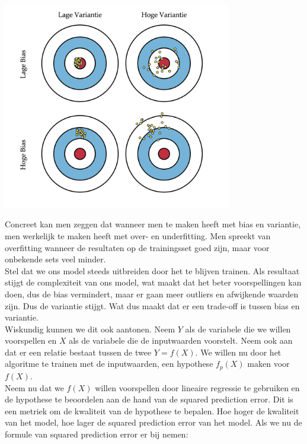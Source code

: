 %
\begin{center}
  \includegraphics[width=10cm]{bulls-eye}
\end{center}
\newline
Concreet kan men zeggen dat wanneer men te maken heeft met bias en variantie, men werkelijk te maken heeft met over- en underfitting. Men spreekt van overfitting wanneer de resultaten op de trainingsset goed zijn, maar voor onbekende sets veel minder.\\
Stel dat we ons model steeds uitbreiden door het te blijven trainen. Als resultaat stijgt de complexiteit van ons model, wat maakt dat het beter voorspellingen kan doen, dus de bias vermindert, maar er gaan meer outliers en afwijkende waarden zijn. Dus de variantie stijgt. Wat dus maakt dat er een trade-off is tussen bias en variantie.\\ 
%
Wiskundig kunnen we dit ook aantonen. Neem $Y$ als de variabele die we willen voorspellen en $X$ als de variabele die de inputwaarden voorstelt. Neem ook aan dat er een relatie bestaat tussen de twee $Y=f(X)$. We willen nu door het algoritme te trainen met de inputwaarden, een hypothese $f_{p}(X)$ maken voor $f(X)$. \\
Neem nu dat we $f(X)$ willen voorspellen door lineaire regressie te gebruiken en de hypothese te beoordelen aan de hand van de squared prediction error. Dit is een metriek om de kwaliteit van de hypothese te bepalen. Hoe hoger de kwaliteit van het model, hoe lager de squared prediction error van het model. Als we nu de formule van squared prediction error er bij nemen:

